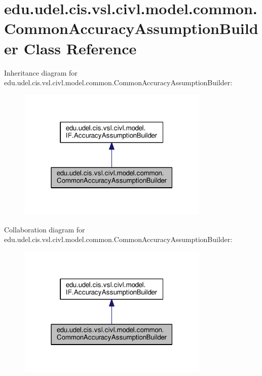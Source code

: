 \hypertarget{classedu_1_1udel_1_1cis_1_1vsl_1_1civl_1_1model_1_1common_1_1CommonAccuracyAssumptionBuilder}{}\section{edu.\+udel.\+cis.\+vsl.\+civl.\+model.\+common.\+Common\+Accuracy\+Assumption\+Builder Class Reference}
\label{classedu_1_1udel_1_1cis_1_1vsl_1_1civl_1_1model_1_1common_1_1CommonAccuracyAssumptionBuilder}


Inheritance diagram for edu.\+udel.\+cis.\+vsl.\+civl.\+model.\+common.\+Common\+Accuracy\+Assumption\+Builder\+:
\nopagebreak
\begin{figure}[H]
\begin{center}
\leavevmode
\includegraphics[width=259pt]{classedu_1_1udel_1_1cis_1_1vsl_1_1civl_1_1model_1_1common_1_1CommonAccuracyAssumptionBuilder__inherit__graph}
\end{center}
\end{figure}


Collaboration diagram for edu.\+udel.\+cis.\+vsl.\+civl.\+model.\+common.\+Common\+Accuracy\+Assumption\+Builder\+:
\nopagebreak
\begin{figure}[H]
\begin{center}
\leavevmode
\includegraphics[width=259pt]{classedu_1_1udel_1_1cis_1_1vsl_1_1civl_1_1model_1_1common_1_1CommonAccuracyAssumptionBuilder__coll__graph}
\end{center}
\end{figure}
